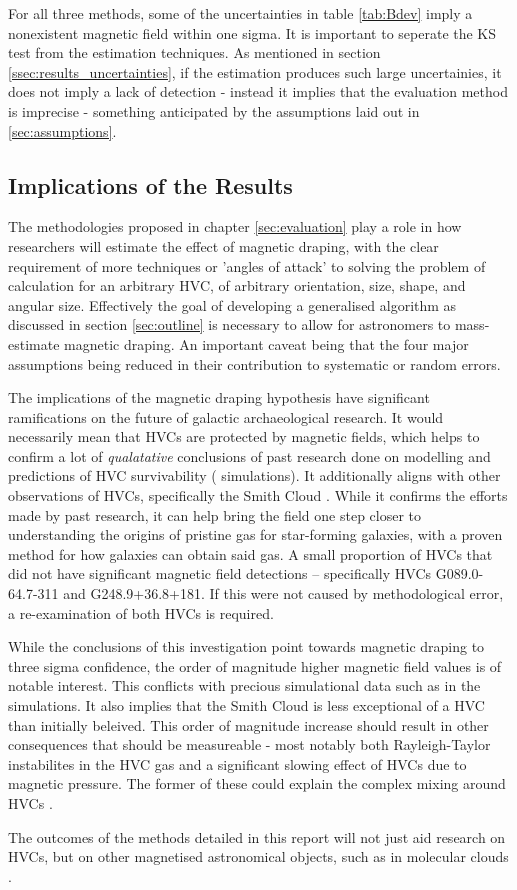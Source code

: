 For all three methods, some of the uncertainties in table \ref{tab:Bdev} imply a nonexistent magnetic field within one sigma. It is important to seperate the KS test from the estimation techniques. As mentioned in section \ref{ssec:results_uncertainties}, if the estimation produces such large uncertainies, it does not imply a lack of detection - instead it implies that the evaluation method is imprecise - something anticipated by the assumptions laid out in \ref{sec:assumptions}.

\subsection{Implications of the Results}
\label{ssec:B4}

The methodologies proposed in chapter \ref{sec:evaluation} play a role in how researchers will estimate the effect of magnetic draping, with the clear requirement of more techniques or 'angles of attack' to solving the problem of calculation for an arbitrary HVC, of arbitrary orientation, size, shape, and angular size. Effectively the goal of developing a generalised algorithm as discussed in section \ref{sec:outline} is necessary to allow for astronomers to mass-estimate magnetic draping. An important caveat being that the four major assumptions being reduced in their contribution to systematic or random errors.


The implications of the magnetic draping hypothesis have significant ramifications on the future of galactic archaeological research. It would necessarily mean that HVCs are protected by magnetic fields, which helps to confirm a lot of \textit{qualatative} conclusions of past research done on modelling and predictions of HVC survivability (\citeauthor{ID23} simulations). It additionally aligns with other observations of HVCs, specifically the Smith Cloud \citep{ID5, ID26}. While it confirms the efforts made by past research, it can help bring the field one step closer to understanding the origins of pristine gas for star-forming galaxies, with a proven method for how galaxies can obtain said gas. A small proportion of HVCs that did not have significant magnetic field detections – specifically HVCs G089.0-64.7-311 and G248.9+36.8+181. If this were not caused by methodological error, a re-examination of both HVCs is required.


While the conclusions of this investigation point towards magnetic draping to three sigma confidence, the order of magnitude higher magnetic field values is of notable interest. This conflicts with precious simulational data such as in the \citeauthor{ID23} simulations. It also implies that the Smith Cloud is less exceptional of a HVC than initially beleived. This order of magnitude increase should result in other consequences that should be measureable - most notably both Rayleigh-Taylor instabilites in the HVC gas and a significant slowing effect of HVCs due to magnetic pressure. The former of these could explain the complex mixing around HVCs \citep{ID67}.


The outcomes of the methods detailed in this report will not just aid research on HVCs, but on other magnetised astronomical objects, such as in molecular clouds \citep{ID70}.
